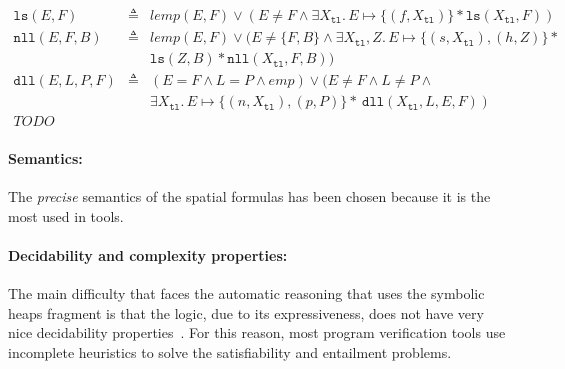 \documentclass{llncs}
\newcommand{\sep}{.\,}
\newcommand{\posep}{*}
\newcommand{\points}{\mapsto}
\newcommand{\cdr}{\mathtt{tl}}
\newcommand{\lemp}{\mathit{lemp}}
\newcommand{\ls}{\mathtt{ls}}
\newcommand{\dll}{\mathtt{dll}}
\newcommand{\nll}{\mathtt{nll}}
\begin{document}
\begin{table}
\begin{eqnarray}
\ls(E,F) & \triangleq & \mathit{lemp}(E,F)\lor (E\neq F \land
\exists X_\cdr\sep E\points\{(f,X_\cdr)\}\posep \ls(X_\cdr,F))
\\[1mm]
\nll(E,F,B) & \triangleq & \lemp(E,F)\lor (E\neq \{F,B\}
\land \exists X_\cdr,Z\sep E\points\{(s,X_\cdr),(h,Z)\}\posep\\ 
&& \ls(Z,B) \posep\nll(X_\cdr,F,B)) \nonumber
\\[1mm]
\dll(E, L, P, F) & \triangleq & (E=F\land L=P\land \mathit{emp}) \lor \big( E\neq F \land L\neq P \land \\
&& \exists X_\cdr\sep E\points \{(n,X_\cdr),(p,P)\} \posep\ \dll(X_\cdr,L,E,F)\ \big)\nonumber
\\[1mm]
TODO
\end{eqnarray}

\caption{Examples of recursive definitions used in the benchmark %
($\mathit{lemp}(E,F)\triangleq E=F\land\mathit{emp}$)%
}
\label{tab:RD}

\end{table}

\paragraph{Semantics:}
The \emph{precise} semantics of the spatial formulas has been chosen because it is the most used in tools.


\paragraph{Decidability and complexity properties:}
The main difficulty that faces the automatic reasoning that uses the symbolic heaps fragment is that the logic, 
due to its expressiveness, does not have very nice decidability properties~\cite{AntonopoulosGHKO14}.
For this reason, most program verification tools use incomplete heuristics to solve the satisfiability and entailment problems.
\end{document}
